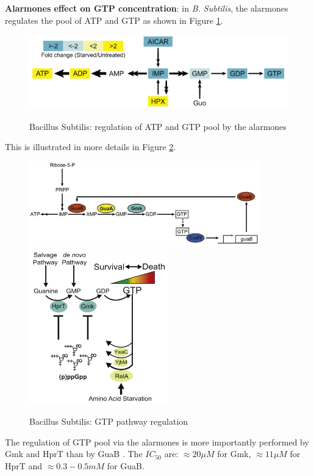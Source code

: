 {\bf Alarmones effect on GTP concentration}: in {\it B. Subtilis}, the alarmones regulates the pool of ATP and GTP as shown in Figure \ref{fig:alarmoneEnergyReg}.
\begin{figure}[hbtp]
  \centering
  \includegraphics[width=15cm]{figure/alarmoneEnergy.png}\\
  \caption{Bacillus Subtilis: regulation of ATP and GTP pool by the alarmones \citep{kriel_direct_2012}}\label{fig:alarmoneEnergyReg}
\end{figure}
This is illustrated in more details in Figure \ref{fig:alarmoneGTPReg}.
\begin{figure}[hbtp]
  \centering
  \includegraphics[width=10cm]{figure/alarmoneGTPPathway1.png} \\ \includegraphics[width=6cm]{figure/alarmoneGTPPathway2.png}\\
  \caption{Bacillus Subtilis: GTP pathway regulation \citep{kriel_direct_2012}}\label{fig:alarmoneGTPReg}
\end{figure}
The regulation of GTP pool via the alarmones is more importantly performed by Gmk and HprT than by GuaB \citep{kriel_direct_2012}. The $IC_{50}$ are: $\approx 20 \mu M$ for Gmk, $\approx 11 \mu M$ for HprT and $\approx 0.3-0.5 mM$ for GuaB.



